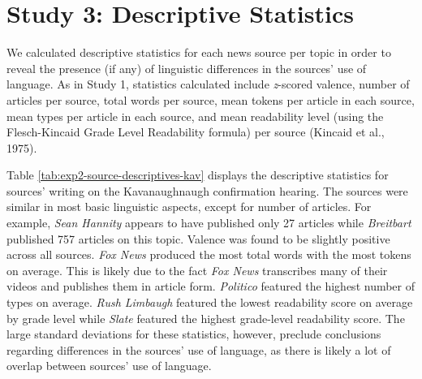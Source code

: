 \documentclass[
  man,floatsintext]{apa6}
\begin{document}
\section{Study 3: Descriptive Statistics}\label{study-3-descriptive-statistics}

We calculated descriptive statistics for each news source per topic in
order to reveal the presence (if any) of linguistic differences in the
sources' use of language. As in Study 1, statistics calculated include
\emph{z}-scored valence, number of articles per source, total words per
source, mean tokens per article in each source, mean types per article
in each source, and mean readability level (using the Flesch-Kincaid
Grade Level Readability formula) per source (Kincaid et al., 1975).

Table \ref{tab:exp2-source-descriptives-kav} displays the descriptive
statistics for sources' writing on the Kavanaughnaugh confirmation
hearing. The sources were similar in most basic linguistic aspects,
except for number of articles. For example, \emph{Sean Hannity} appears to
have published only 27 articles while \emph{Breitbart} published 757 articles
on this topic. Valence was found to be slightly positive across all
sources. \emph{Fox News} produced the most total words with the most tokens
on average. This is likely due to the fact \emph{Fox News} transcribes many
of their videos and publishes them in article form. \emph{Politico} featured
the highest number of types on average. \emph{Rush Limbaugh} featured the
lowest readability score on average by grade level while \emph{Slate}
featured the highest grade-level readability score. The large standard
deviations for these statistics, however, preclude conclusions regarding
differences in the sources' use of language, as there is likely a lot of
overlap between sources' use of language.
\end{document}
